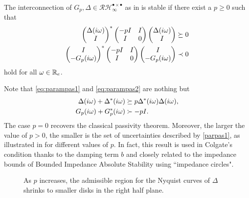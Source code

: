 \begin{coroll}\label{thm:desvidpass} The interconnection of $G_p,\Delta\in 
\mathcal{RH}^{\bullet \times \bullet}_\infty$ as in  is stable
if there exist a ${p\geq 0}$ such that
\begin{align}
\begin{pmatrix}\Delta(i\omega)\\I\end{pmatrix}^*\begin{pmatrix}-pI &I\\I &0\end{pmatrix}\begin{pmatrix}\Delta(i\omega)\\ I\end{pmatrix} &\succeq 0 \label{eq:parampas1}\\
\begin{pmatrix}I\\ -G_p(i\omega)\end{pmatrix}^*\begin{pmatrix}-pI &I\\I &0\end{pmatrix}\begin{pmatrix}I\\ -G_p(i\omega)\end{pmatrix} &\prec 0 \label{eq:parampas2}
\end{align} hold for all $\omega\in\mathbb{R}_e$.
\end{coroll}

\begin{rem}Note that \eqref{eq:parampas1} and \eqref{eq:parampas2} are nothing but
\begin{align}
	\Delta(i\omega) + \Delta^*(i\omega) &\succeq p\Delta^*(i\omega)\Delta(i\omega),\label{parpas1}\\
	G_p(i\omega) + G_p^*(i\omega) &\succ -pI.\label{parpas2}
\end{align}
The case $p=0$ recovers the classical passivity theorem. Moreover, the larger the value of $p>0$, 
the smaller is the set of uncertainties described by \eqref{parpas1}, as illustrated in  
for different values of $p$. In fact, this result is used in Colgate's condition thanks to the damping term 
$b$ and closely related to the impedance bounds of Bounded Impedance Absolute Stability \cite{haddadizaad} 
using ``impedance circles".
\end{rem}

\begin{figure}%
\centering
{}
\caption{As $p$ increases, the admissible region for the Nyquist curves of $\Delta$ shrinks to smaller disks in the right half plane.}
\label{fig:pregions}%
\end{figure}

